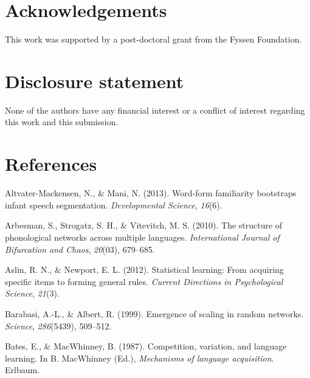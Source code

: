 \documentclass[english,floatsintext,man]{apa6}
\theoremstyle{definition}
\theoremstyle{definition}
\theoremstyle{definition}
\theoremstyle{remark}
\begin{document}
\vspace{1em}

\vspace{1em}

\section{Acknowledgements}\label{acknowledgements}

This work was supported by a post-doctoral grant from the Fyssen
Foundation.

\section{Disclosure statement}\label{disclosure-statement}

None of the authors have any financial interest or a conflict of
interest regarding this work and this submission.

\section{References}\label{references}

\setlength{\parindent}{-0.5in} \setlength{\leftskip}{0.5in}

\hypertarget{refs}{}
\hypertarget{ref-altvater2013}{}
Altvater-Mackensen, N., \& Mani, N. (2013). Word-form familiarity
bootstraps infant speech segmentation. \emph{Developmental Science},
\emph{16}(6).

\hypertarget{ref-arbesman2010}{}
Arbesman, S., Strogatz, S. H., \& Vitevitch, M. S. (2010). The structure
of phonological networks across multiple languages. \emph{International
Journal of Bifurcation and Chaos}, \emph{20}(03), 679--685.

\hypertarget{ref-aslin2012}{}
Aslin, R. N., \& Newport, E. L. (2012). Statistical learning: From
acquiring specific items to forming general rules. \emph{Current
Directions in Psychological Science}, \emph{21}(3).

\hypertarget{ref-barabasi99}{}
Barabasi, A.-L., \& Albert, R. (1999). Emergence of scaling in random
networks. \emph{Science}, \emph{286}(5439), 509--512.

\hypertarget{ref-bates1987}{}
Bates, E., \& MacWhinney, B. (1987). Competition, variation, and
language learning. In B. MacWhinney (Ed.), \emph{Mechanisms of language
acquisition}. Erlbaum.
\end{document}
